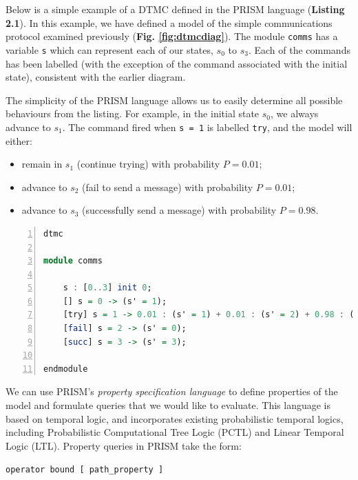 \documentclass{l4proj}
\begin{document}
Below is a simple example of a DTMC defined in the PRISM language (\textbf{Listing 2.1}). In this example, we have defined a model of the simple communications protocol examined previously (\textbf{Fig. \ref{fig:dtmcdiag}}). The module \texttt{comms} has a variable \texttt{s} which can represent each of our states, $s_0$ to $s_3$. Each of the commands has been labelled (with the exception of the command associated with the initial state), consistent with the earlier diagram.

The simplicity of the PRISM language allows us to easily determine all possible behaviours from the listing. For example, in the initial state $s_0$, we always advance to $s_1$. The command fired when \texttt{s = 1} is labelled \texttt{try}, and the model will either:

\begin{itemize}
    \item remain in $s_1$ (continue trying) with probability $P = 0.01$;
    \item advance to $s_2$ (fail to send a message) with probability $P = 0.01$;
    \item advance to $s_3$ (successfully send a message) with probability $P = 0.98$.
\end{itemize}

\clearpage
\begin{lstlisting}[language=Haskell, numbers=left, caption=A DTMC representation in the PRISM modelling language. This excerpt describes the simple communications protocol depicted in \textbf{Fig. \ref{fig:dtmcdiag}}.] 
dtmc 

module comms

	s : [0..3] init 0;
	[] s = 0 -> (s' = 1);
	[try] s = 1 -> 0.01 : (s' = 1) + 0.01 : (s' = 2) + 0.98 : (s' = 3);
	[fail] s = 2 -> (s' = 0);
    [succ] s = 3 -> (s' = 3);

endmodule
\end{lstlisting}

We can use PRISM's \textit{property specification language} to define properties of the model and formulate queries that we would like to evaluate. This language is based on temporal logic, and incorporates existing probabilistic temporal logics, including Probabilistic Computational Tree Logic (PCTL) and Linear Temporal Logic (LTL). Property queries in PRISM take the form:

\begin{center}
    \texttt{operator bound [ path\_property ]}
\end{center}
\end{document}
